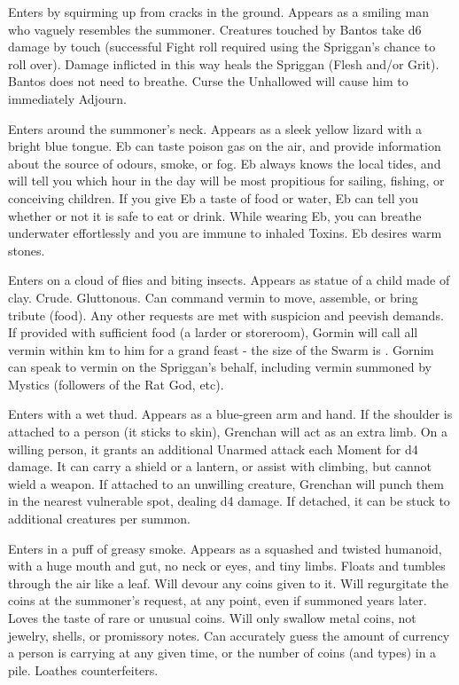 {
Enters by squirming up from cracks in the ground. Appears as a smiling man who vaguely resembles the summoner. Creatures touched by Bantos take d6 damage by touch (successful Fight roll required using the Spriggan's chance to roll over). Damage inflicted in this way heals the Spriggan (Flesh and/or Grit).  Bantos does not need to breathe.  Curse the Unhallowed will cause him to immediately Adjourn. 

Enters around the summoner's neck. Appears as a sleek yellow lizard with a bright blue tongue. Eb can taste poison gas on the air, and provide information about the source of odours, smoke, or fog. Eb always knows the local tides, and will tell you which hour in the day will be most propitious for sailing, fishing, or conceiving children. If you give Eb a taste of food or water, Eb can tell you whether or not it is safe to eat or drink.  While wearing Eb, you can breathe underwater effortlessly and you are immune to inhaled Toxins.  Eb desires warm stones.


Enters on a cloud of flies and biting insects. Appears as statue of a child made of clay. Crude. Gluttonous. Can command vermin to move, assemble, or bring tribute (food). Any other requests are met with suspicion and peevish demands. If provided with sufficient food (a larder or storeroom), Gormin will call all vermin within \DICE km to him for a grand feast - the size of the Swarm is \DICE \HD.  Gornim can speak to vermin on the Spriggan's behalf, including vermin summoned by Mystics (followers of the Rat God, etc).  


Enters with a wet thud. Appears as a blue-green arm and hand. If the shoulder is attached to a person (it sticks to skin), Grenchan will act as an extra limb. On a willing person, it grants an additional Unarmed attack each Moment for d4 damage. It can carry a shield or a lantern, or assist with climbing, but cannot wield a weapon.  If attached to an unwilling creature, Grenchan will punch them in the nearest vulnerable spot, dealing d4 damage. If detached, it can be stuck to \DICE additional creatures per summon. 



Enters in a puff of greasy smoke. Appears as a squashed and twisted humanoid, with a huge mouth and gut, no neck or eyes, and tiny limbs. Floats and tumbles through the air like a leaf. Will devour any coins given to it. Will regurgitate the coins at the summoner's request, at any point, even if summoned years later. Loves the taste of rare or unusual coins. Will only swallow metal coins, not jewelry, shells, or promissory notes. Can accurately guess the amount of currency a person is carrying at any given time, or the number of coins (and types) in a pile. Loathes counterfeiters. 


}
